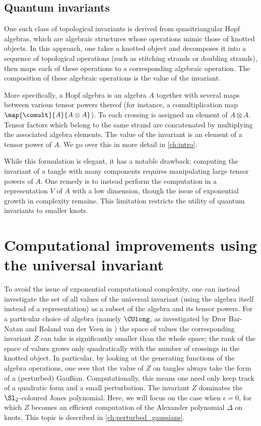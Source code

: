 \subsection{Quantum invariants}

One such class of topological invariants is derived from quasitriangular Hopf
algebras, which are algebraic structures whose operations mimic those of knotted
objects. In this approach, one takes a knotted object and decomposes it into a
sequence of topological operations (such as stitching strands or doubling
strands), then maps each of these operations to a corresponding algebraic
operation. The composition of these algebraic operations is the value of the
invariant.

More specifically, a Hopf algebra is an algebra $A$ together with several maps
between various tensor powers thereof (for instance, a comultiplication map
$\map {\comult} {A} {A \otimes A}$). To each crossing is assigned an element of
$A \otimes A$. Tensor factors which belong to the same strand are concatenated
by multiplying the associated algebra elements. The value of the invariant is an
element of a tensor power of $A$. We go over this in more detail in
\cref{ch:intro}.

While this formulation is elegant, it has a notable drawback: computing the
invariant of a tangle with many components requires manipulating
large tensor powers of $A$. One remedy is to instead perform the computation in
a representation $V$ of $A$ with a low dimension, though the issue of
exponential growth in complexity remains. This limitation restricts the utility
of quantum invariants to smaller knots.

\section{Computational improvements using the universal invariant}
To avoid the issue of exponential computational complexity, one can instead
investigate the set of all values of the universal invariant (using the algebra
itself instead of a representation) as a subset of the algebra and its tensor
powers. For a particular choice of algebra (namely $\CUlong$, as investigated by
Dror Bar-Natan and Roland van der Veen in \cite{BV}) the space of values the
corresponding invariant $Z$ can take is significantly smaller than the whole
space; the rank of the space of values grows only quadratically with the number
of crossings in the knotted object. In particular, by looking at the generating
functions of the algebra operations, one sees that the value of $Z$ on tangles
always take the form of a (perturbed) Gaußian. Computationally, this means one
need only keep track of a quadratic form and a small perturbation. The invariant
$Z$ dominates the $\Sl_2$-coloured Jones polynomial. Here, we will focus on the
case when $ϵ=0$, for which $Z$ becomes an efficient computation of the Alexander
polynomial $Δ$ on knots. This topic is described in
\cref{ch:perturbed_gaussians}.

